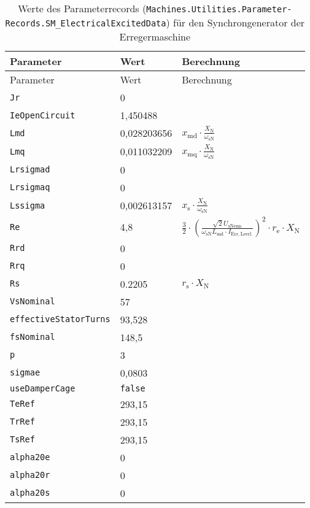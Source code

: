 \begin{longtable}[]{@{}lll@{}}
\caption{Werte des Parameterrecords (\texttt{Machines.­Utilities.­Parameter­Records.­SM\_­ElectricalExcited­Data}) für den Synchrongenerator der Erregermaschine}\label{tab:ParameterRecordErregermaschine}
\tabularnewline
\toprule
Parameter & Wert & Berechnung \\
\midrule
\endfirsthead
\toprule
Parameter & Wert & Berechnung \\
\midrule
\endhead
\texttt{Jr}                   & 0              & \\
\texttt{IeOpenCircuit}        & 1,450488       & \\
\texttt{Lmd}                  & 0,028203656    & $x_{\mathrm{md}}\cdot \frac{X_{\mathrm{N}}}{\omega_{\mathrm{sN}}}$\\
\texttt{Lmq}                  & 0,011032209    & $x_{\mathrm{mq}}\cdot \frac{X_{\mathrm{N}}}{\omega_{\mathrm{sN}}}$\\
\texttt{Lrsigmad}             & 0              & \\
\texttt{Lrsigmaq}             & 0              & \\
\texttt{Lssigma}              & 0,002613157    & $x_{\mathrm{s}}\cdot \frac{X_{\mathrm{N}}}{\omega_{\mathrm{sN}}}$\\
\texttt{Re}                   & 4,8            & $\frac{3}{2}\cdot \left(\frac{\sqrt{2}U_{\mathrm{sNenn}}}{\omega_{\mathrm{sN}}L_{\mathrm{md}}\cdot I_{\mathrm{Err,Leerl.}}}\right)^2\cdot r_{\mathrm{e}}\cdot X_{\mathrm{N}}$\\
\texttt{Rrd}                  & 0              & \\
\texttt{Rrq}                  & 0              & \\
\texttt{Rs}                   & 0.2205         & $r_{\mathrm{s}}\cdot X_{\mathrm{N}}$\\
\texttt{VsNominal}            & 57             & \\
\texttt{effectiveStatorTurns} & 93,528         & \\
\texttt{fsNominal}            & 148,5          & \\
\texttt{p}                    & 3              & \\
\texttt{sigmae}               & 0,0803         & \\
\texttt{useDamperCage}        & \texttt{false} & \\
\texttt{TeRef}                & 293,15         & \\
\texttt{TrRef}                & 293,15         & \\
\texttt{TsRef}                & 293,15         & \\
\texttt{alpha20e}             & 0              & \\
\texttt{alpha20r}             & 0              & \\
\texttt{alpha20s}             & 0              & \\
\bottomrule
\end{longtable}


